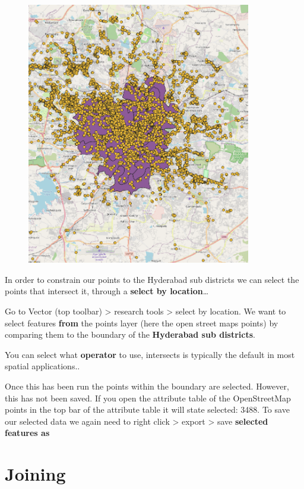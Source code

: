 \documentclass[
  letterpaper,
]{scrbook}
\begin{document}
\begin{figure}

{\centering \includegraphics[width=3.85417in,height=\textheight]{general_images/points_outside_study_area.png}

}

\end{figure}

In order to constrain our points to the Hyderabad sub districts we can
select the points that intersect it, through a \textbf{select by
location}\ldots{}

Go to Vector (top toolbar) \textgreater{} research tools \textgreater{}
select by location. We want to select features \textbf{from} the points
layer (here the open street maps points) by comparing them to the
boundary of the \textbf{Hyderabad sub districts}.

You can select what \textbf{operator} to use, intersects is typically
the default in most spatial applications..

Once this has been run the points within the boundary are selected.
However, this has not been saved. If you open the attribute table of the
OpenStreetMap points in the top bar of the attribute table it will state
selected: 3488. To save our selected data we again need to right click
\textgreater{} export \textgreater{} save \textbf{selected features as}

\hypertarget{joining}{%
\section{Joining}\label{joining}}
\end{document}
